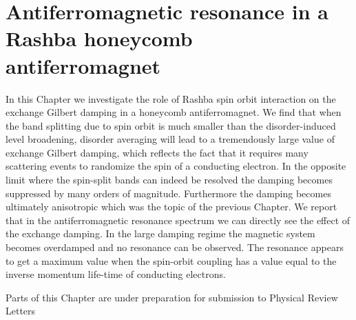 \chapter{Antiferromagnetic resonance in a Rashba honeycomb antiferromagnet} %
\label{ch:robert}
In this Chapter we investigate the role of Rashba spin orbit interaction on the exchange Gilbert damping in a honeycomb antiferromagnet. We find that when the band splitting due to spin orbit is much smaller than the disorder-induced level broadening, disorder averaging will lead to a tremendously large value of exchange Gilbert damping, which reflects the fact that it requires many scattering events to randomize the spin of a conducting electron. In the opposite limit where the spin-split bands can indeed be resolved the damping becomes suppressed by many orders of magnitude. Furthermore the damping becomes ultimately anisotropic which was the topic of the previous Chapter. We report that in the antiferromagnetic resonance spectrum we can directly see the effect of the exchange damping. In the large damping regime the magnetic system becomes overdamped and no resonance can be observed. The resonance appears to get a maximum value when the spin-orbit coupling has a value equal to the inverse momentum life-time of conducting electrons. 

\vfill
Parts of this Chapter are under preparation for submission to Physical Review Letters\clearpage




